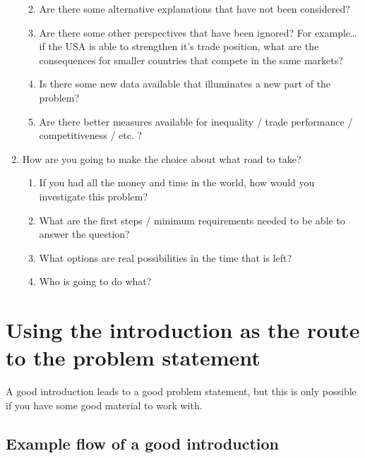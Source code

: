 \documentclass[
]{book}
\begin{document}
\begin{enumerate}
  \begin{enumerate}
  \def\labelenumii{\arabic{enumii}.}
  \item
    Are there some alternative explanations that have not been considered?
  \item
    Are there some other perspectives that have been ignored? For example\ldots{} if the USA is able to strengthen it's trade position, what are the consequences for smaller countries that compete in the same markets?
  \item
    Is there some new data available that illuminates a new part of the problem?
  \item
    Are there better measures available for inequality / trade performance / competitiveness / etc. ?
  \end{enumerate}
\item
  How are you going to make the choice about what road to take?

  \begin{enumerate}
  \def\labelenumii{\arabic{enumii}.}
  \item
    If you had all the money and time in the world, how would you investigate this problem?
  \item
    What are the first steps / minimum requirements needed to be able to answer the question?
  \item
    What options are real possibilities in the time that is left?
  \item
    Who is going to do what?
  \end{enumerate}
\end{enumerate}

\hypertarget{using-the-introduction-as-the-route-to-the-problem-statement}{%
\section{Using the introduction as the route to the problem statement}\label{using-the-introduction-as-the-route-to-the-problem-statement}}

A good introduction leads to a good problem statement, but this is only
possible if you have some good material to work with.

\hypertarget{example-flow-of-a-good-introduction}{%
\subsection{Example flow of a good introduction}\label{example-flow-of-a-good-introduction}}
\end{document}
